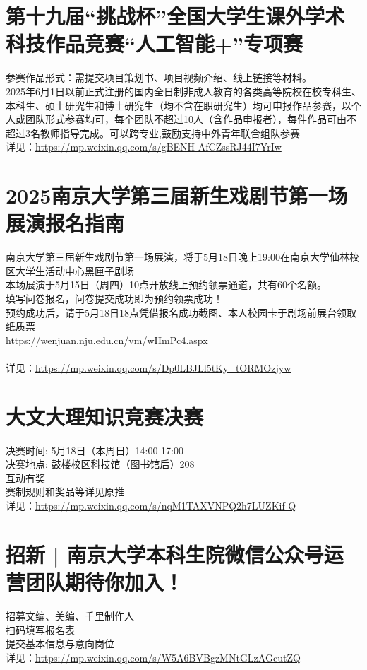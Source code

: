 \documentclass[letterpaper, 12pt]{article}
\begin{document}
\begin{multicols}{2}
\section{第十九届“挑战杯”全国大学生课外学术科技作品竞赛“人工智能+”专项赛}
参赛作品形式：需提交项目策划书、项目视频介绍、线上链接等材料。
\\2025年6月1日以前正式注册的国内全日制非成人教育的各类高等院校在校专科生、本科生、硕士研究生和博士研究生（均不含在职研究生）均可申报作品参赛，以个人或团队形式参赛均可，每个团队不超过10人（含作品申报者），每件作品可由不超过3名教师指导完成。可以跨专业,鼓励支持中外青年联合组队参赛
\\详见：\url{https://mp.weixin.qq.com/s/gBENH-AfCZssRJ44I7YrIw}



\section{2025南京大学第三届新生戏剧节第一场展演报名指南} %
南京大学第三届新生戏剧节第一场展演，将于5月18日晚上19:00在南京大学仙林校区大学生活动中心黑匣子剧场
\\本场展演于5月15日（周四）10点开放线上预约领票通道，共有60个名额。
\\填写问卷报名，问卷提交成功即为预约领票成功！
\\预约成功后，请于5月18日18点凭借报名成功截图、本人校园卡于剧场前展台领取纸质票
\\https://wenjuan.nju.edu.cn/vm/wIImPc4.aspx
\\
\\详见：\url{https://mp.weixin.qq.com/s/Dp0LBJLl5tKy_tORMOzjyw}
\section{大文大理知识竞赛决赛} %
决赛时间: 5月18日（本周日）14:00-17:00
\\决赛地点: 鼓楼校区科技馆（图书馆后）208
\\互动有奖
\\赛制规则和奖品等详见原推
\\详见：\url{https://mp.weixin.qq.com/s/nqM1TAXVNPQ2h7LUZKif-Q}

\section{招新 | 南京大学本科生院微信公众号运营团队期待你加入！} %
招募文编、美编、千里制作人
\\扫码填写报名表
\\提交基本信息与意向岗位
\\详见：\url{https://mp.weixin.qq.com/s/W5A6BVBgzMNtGLzAGcutZQ}

\end{multicols}
\end{document}
